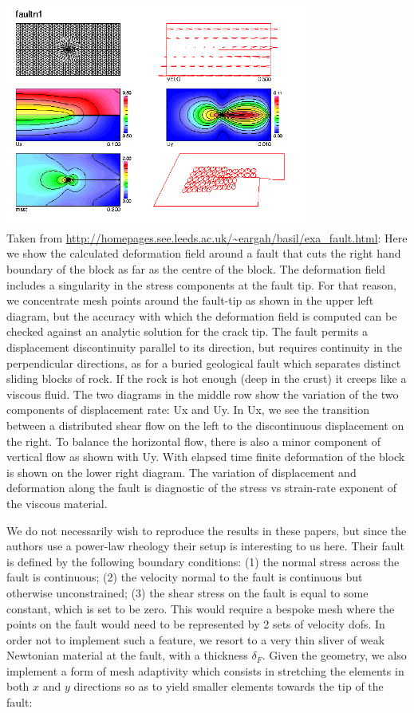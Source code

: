 \begin{center}
\includegraphics[width=10cm]{python_codes/fieldstone_87/images/baho}\\
{\captionfont Taken from 
\url{http://homepages.see.leeds.ac.uk/~eargah/basil/exa_fault.html}: 
Here we show the calculated deformation field around a fault that cuts the right 
hand boundary of the block as far as the centre of the block.  The deformation field 
includes a singularity in the stress components at the fault tip.  For that reason, 
we concentrate mesh points around the fault-tip as shown in the upper left diagram, 
but the accuracy with which the deformation field is computed can be checked against 
an analytic solution for the crack tip.  The fault permits a displacement discontinuity 
parallel to its direction, but requires continuity in the perpendicular directions, 
as for a buried geological fault which separates distinct sliding blocks of rock.  
If the rock is hot enough (deep in the crust) it creeps like a viscous fluid. 
The two diagrams in the middle row show the variation of the two components of displacement rate: 
Ux and Uy.  In Ux, we see the transition between a distributed shear flow on the left to the 
discontinuous displacement on the right.  To balance the horizontal flow, there is also a minor 
component of vertical flow as shown with Uy.  With elapsed time finite deformation of the block 
is shown on the lower right diagram.  The variation of displacement and deformation along the fault 
is diagnostic of the stress vs strain-rate exponent of the viscous material. 
}
\end{center}

We do not necessarily wish to reproduce the results in these papers, but since the authors use a 
power-law rheology their setup is interesting to us here. 
Their fault is defined by the following boundary conditions:
(1) the normal stress across the fault is continuous;
(2) the velocity normal to the fault is continuous but
otherwise unconstrained;
(3) the shear stress on the fault is equal to some constant,
which is set to be zero.
This would require a bespoke mesh where the points on the fault would need to be represented by 2 sets
of velocity dofs. 
In order not to implement such a feature, we resort to a very thin sliver of weak Newtonian material 
at the fault, with a thickness $\delta_F$.
Given the geometry, we also implement a form of mesh adaptivity which consists in 
stretching the elements in both $x$ and $y$ directions so as to yield smaller 
elements towards the tip of the fault:

